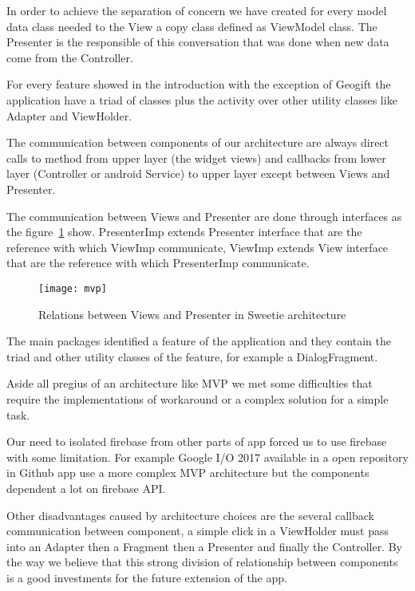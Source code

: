 In order to achieve the separation of concern we have created for every model data class needed to the View a copy class defined as ViewModel class. The Presenter is the responsible of this conversation that was done when new data come from the Controller. 

For every feature showed in the introduction with the exception of Geogift the application have a triad of classes plus the activity over other utility classes like Adapter and ViewHolder. 

The communication between components of our architecture are always direct calls to method from upper layer (the widget views) and callbacks from lower layer (Controller or android Service) to upper layer except between Views and Presenter.

The communication between Views and Presenter are done through interfaces as the figure~\ref{fig:MVP_image} show. PresenterImp extends Presenter interface that are the reference with which ViewImp communicate, ViewImp extends View interface that are the reference with which PresenterImp communicate.

\begin{figure}[h]
	\texttt{[image: mvp]}
	\caption{Relations between Views and Presenter in Sweetie architecture}
	\label{fig:MVP_image}
\end{figure}

The main packages identified a feature of the application and they contain the triad and other utility classes of the feature, for example a DialogFragment.

Aside all pregius of an architecture like MVP we met some difficulties that require the implementations of workaround or a complex solution for a simple task. 

Our need to isolated firebase from other parts of app forced us to use firebase with some limitation. For example Google I/O 2017 available in a open repository in Github \cite{GoogleIO} app use a more complex MVP architecture but the components dependent a lot on firebase API.

Other disadvantages caused by architecture choices are the several callback communication between component, a simple click in a ViewHolder must pass into an Adapter then a Fragment then a Presenter and finally the Controller. By the way we believe that this strong division of relationship between components is a good investments for the future extension of the app.


